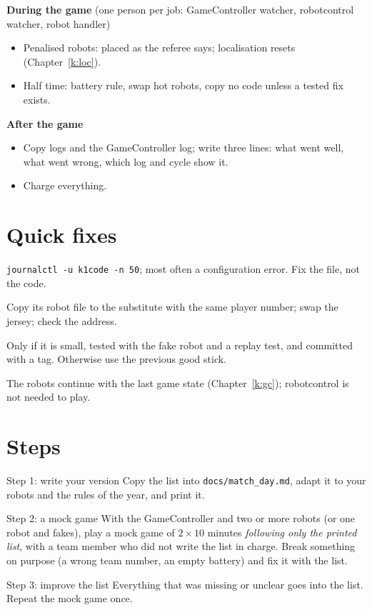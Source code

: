\textbf{During the game} (one person per job: GameController watcher, robotcontrol watcher, robot handler)
\begin{itemize}[nosep]
  \item[$\square$] Penalised robots: placed as the referee says; localisation resets (Chapter~\ref{k:loc}).
  \item[$\square$] Half time: battery rule, swap hot robots, copy no code unless a tested fix exists.
\end{itemize}
\textbf{After the game}
\begin{itemize}[nosep]
  \item[$\square$] Copy logs and the GameController log; write three lines: what went well, what went wrong, which log and cycle show it.
  \item[$\square$] Charge everything.
\end{itemize}

\section*{Quick fixes}
\begin{description}[leftmargin=0.6cm]
  \item[A robot does not start] \verb!journalctl -u k1code -n 50!; most often a configuration error. Fix the file, not the code.
  \item[A broken robot must be replaced] Copy its robot file to the substitute with the same player number; swap the jersey; check the address.
  \item[A fix in the code] Only if it is small, tested with the fake robot and a replay test, and committed with a tag. Otherwise use the previous good stick.
  \item[The Wi-Fi is lost] The robots continue with the last game state (Chapter~\ref{k:gc}); robotcontrol is not needed to play.
\end{description}

\section*{Steps}
\begin{stepbox}{Step 1: write your version}
Copy the list into \texttt{docs/match\_day.md}, adapt it to your robots and the rules of the year, and print it.
\end{stepbox}
\begin{stepbox}{Step 2: a mock game}
With the GameController and two or more robots (or one robot and fakes), play a mock game of $2\times10$ minutes \emph{following only the printed list}, with a team member who did not write the list in charge. Break something on purpose (a wrong team number, an empty battery) and fix it with the list.
\end{stepbox}
\begin{stepbox}{Step 3: improve the list}
Everything that was missing or unclear goes into the list. Repeat the mock game once.
\end{stepbox}

